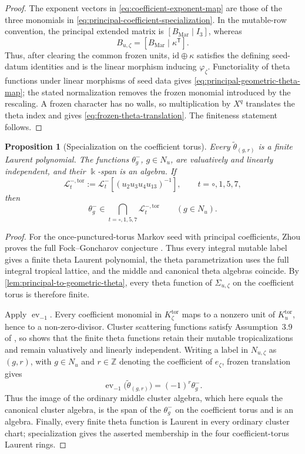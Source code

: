 \documentclass[11pt,reqno]{amsart}
\numberwithin{equation}{section}
\newtheorem{proposition}[proposition]{Proposition}
\theoremstyle{remark}
\newcommand{\kk}{\Bbbk}
\newcommand{\ZZ}{\mathbb{Z}}
\newcommand{\cL}{\mathcal{L}}
\begin{document}
\begin{proof}
The exponent vectors in \eqref{eq:coefficient-exponent-map} are those
of the three monomials in
\eqref{eq:principal-coefficient-specialization}.  In the mutable-row
convention, the principal extended matrix is
$[B_{\mathrm{Mar}}\mid I_3]$, whereas
\[ B_{u,\zeta}=[B_{\mathrm{Mar}}\mid\kappa^{\mathsf T}]. \]
Thus, after clearing the common frozen units,
$\mathrm{id}\oplus\kappa$ satisfies the defining seed-datum identities
and is the linear morphism inducing $\varphi_\zeta$.  Functoriality of
theta functions under linear morphisms of seed data
\cite[Theorem~4.9]{CMMM} gives
\eqref{eq:principal-geometric-theta-map}; the stated normalization removes
the frozen monomial introduced by the rescaling.  A frozen character has no
walls, so multiplication by $X^q$ translates the theta index and gives
\eqref{eq:frozen-theta-translation}.  The finiteness statement follows.
\end{proof}

\begin{proposition}[Specialization on the coefficient torus]
\label{prop:specialized-theta-span}
Every $\widetilde\theta_{(g,r)}$ is a finite Laurent polynomial.  The
functions $\theta_g^-$, $g\in N_u$, are valuatively and linearly
independent, and their $\kk$-span is an algebra.  If
\[ \cL_t^{-,\mathrm{tor}} :=\cL_t^-[(u_2u_3u_4u_{13})^{-1}], \qquad t=\circ,1,5,7, \]
then
\[ \theta_g^-\in \bigcap_{t=\circ,1,5,7}\cL_t^{-,\mathrm{tor}} \qquad(g\in N_u). \]
\end{proposition}

\begin{proof}
For the once-punctured-torus Markov seed with principal coefficients, Zhou
proves the full Fock--Goncharov conjecture
\cite[Theorem~1.1]{Zhou}.  Thus every integral mutable label gives a finite
theta Laurent polynomial, the theta parametrization uses the full integral
tropical lattice, and the middle and canonical theta algebras coincide.  By
\cref{lem:principal-to-geometric-theta}, every theta function of
$\Sigma_{u,\zeta}$ on the coefficient torus is therefore finite.

Apply $\operatorname{ev}_{-1}$.  Every coefficient monomial in
$K_\zeta^{\mathrm{tor}}$ maps to a nonzero unit of
$K_u^{\mathrm{tor}}$, hence to a non-zero-divisor.  Cluster scattering
functions satisfy Assumption~3.9 of \cite{CMMM}, so
\cite[Theorem~3.10]{CMMM} shows that the finite theta functions retain their
mutable tropicalizations and remain valuatively and linearly independent.
Writing a label in $N_{u,\zeta}$ as $(g,r)$, with
$g\in N_u$ and $r\in\ZZ$ denoting the coefficient of $e_\zeta$,
frozen translation gives
\[ \operatorname{ev}_{-1}\bigl(\widetilde\theta_{(g,r)}\bigr) =(-1)^r\theta_g^-. \]
Thus the image of the ordinary middle cluster algebra, which here equals the
canonical cluster algebra, is the span of the $\theta_g^-$ on the coefficient
torus and is an algebra.  Finally, every finite theta function is Laurent in every ordinary
cluster chart; specialization gives the asserted membership in the four
coefficient-torus Laurent rings.
\end{proof}
\end{document}
